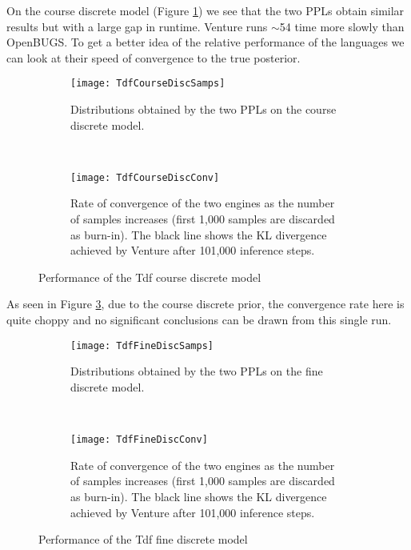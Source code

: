 On the course discrete model (Figure \ref{fig:tdfCourseDiscSamp}) we see that the two PPLs obtain similar results but with a large gap in runtime. Venture runs $\sim$54 time more slowly than OpenBUGS. To get a better idea of the relative performance of the languages we can look at their speed of convergence to the true posterior.

\begin{figure}[h]
    \centering
    \begin{subfigure}[t]{0.48\textwidth}
      \texttt{[image: TdfCourseDiscSamps]}
      \caption{Distributions obtained by the two PPLs on the course discrete model.}
      \label{fig:tdfCourseDiscSamp}
    \end{subfigure}
    ~
    \begin{subfigure}[t]{0.48\textwidth}
      \texttt{[image: TdfCourseDiscConv]}
      \caption{Rate of convergence of the two engines as the number of samples increases (first 1,000 samples are discarded as burn-in). The black line shows the KL divergence achieved by Venture after 101,000 inference steps.}
      \label{fig:tdfCourseDiscConv}
    \end{subfigure}
    \caption{Performance of the Tdf course discrete model}
\end{figure}

As seen in Figure \ref{fig:tdfCourseDiscConv}, due to the course discrete prior, the convergence rate here is quite choppy and no significant conclusions can be drawn from this single run. 


\begin{figure}[h]
    \centering
    \begin{subfigure}[t]{0.48\textwidth}
      \texttt{[image: TdfFineDiscSamps]}
      \caption{Distributions obtained by the two PPLs on the fine discrete model.}
      \label{fig:tdfFineDiscSamp}
    \end{subfigure}
    ~
    \begin{subfigure}[t]{0.48\textwidth}
      \texttt{[image: TdfFineDiscConv]}
      \caption{Rate of convergence of the two engines as the number of samples increases (first 1,000 samples are discarded as burn-in). The black line shows the KL divergence achieved by Venture after 101,000 inference steps.}
      \label{fig:tdfFineDiscConv}
    \end{subfigure}
    \caption{Performance of the Tdf fine discrete model}
\end{figure}

